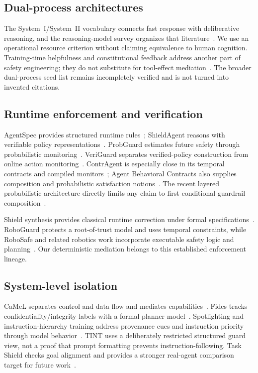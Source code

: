\documentclass[lettersize,journal]{IEEEtran}
\begin{document}
\subsection{Dual-process architectures}
The System~I/System~II vocabulary connects fast response with deliberative
reasoning, and the reasoning-model survey organizes that
literature~\cite{arxiv250217419}. We use an operational resource criterion
without claiming equivalence to human cognition. Training-time helpfulness
and constitutional feedback address another part of safety engineering;
they do not substitute for tool-effect mediation~\cite{arxiv220405862,arxiv221208073}.
The broader dual-process seed list remains incompletely verified and is not
turned into invented citations.

\subsection{Runtime enforcement and verification}
AgentSpec provides structured runtime rules~\cite{arxiv250318666}; ShieldAgent
reasons with verifiable policy representations~\cite{arxiv250322738}.
ProbGuard estimates future safety through probabilistic
monitoring~\cite{arxiv250800500}. VeriGuard separates verified-policy
construction from online action monitoring~\cite{arxiv251005156}.
ContrAgent is especially close in its temporal contracts and compiled
monitors~\cite{arxiv260918128}; Agent Behavioral Contracts also supplies
composition and probabilistic satisfaction notions~\cite{arxiv260222302}.
The recent layered probabilistic architecture directly limits any claim to
first conditional guardrail composition~\cite{arxiv260518672}.

Shield synthesis provides classical runtime correction under formal
specifications~\cite{arxiv150102573,arxiv170808611,arxiv190805402,arxiv240604184}.
RoboGuard protects a root-of-trust model and uses temporal constraints, while
RoboSafe and related robotics work incorporate executable safety logic and
planning~\cite{arxiv250307885,arxiv251221220,arxiv250315707,arxiv260223719}.
Our deterministic mediation belongs to this established enforcement lineage.

\subsection{System-level isolation}
CaMeL separates control and data flow and mediates
capabilities~\cite{arxiv250318813}. Fides tracks confidentiality/integrity
labels with a formal planner model~\cite{arxiv250523643}. Spotlighting and
instruction-hierarchy training address provenance cues and instruction
priority through model behavior~\cite{arxiv240314720,arxiv240413208}.
TINT uses a deliberately restricted structured guard view, not a proof that
prompt formatting prevents instruction-following. Task Shield checks goal
alignment and provides a stronger real-agent comparison target for future
work~\cite{arxiv241216682}.
\end{document}
